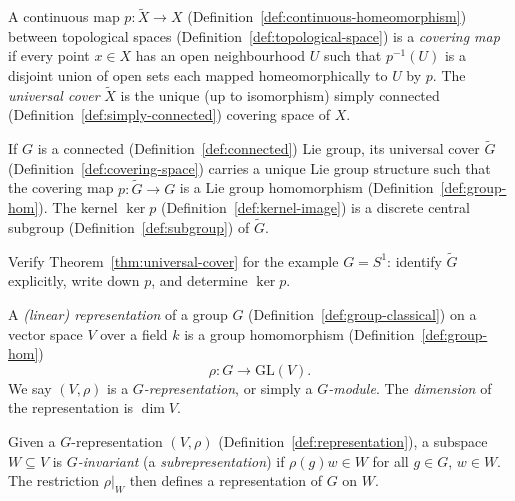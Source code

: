 \begin{definition}
\label{def:covering-space}
A continuous map $p : \widetilde{X} \to X$ (Definition~\ref{def:continuous-homeomorphism}) between topological spaces (Definition~\ref{def:topological-space}) is a \emph{covering map} if every point $x \in X$ has an open neighbourhood $U$ such that $p^{-1}(U)$ is a disjoint union of open sets each mapped homeomorphically to $U$ by $p$.
The \emph{universal cover} $\widetilde{X}$ is the unique (up to isomorphism) simply connected (Definition~\ref{def:simply-connected}) covering space of $X$.
\end{definition}

\begin{theorem}
\label{thm:universal-cover}
If $G$ is a connected (Definition~\ref{def:connected}) Lie group, its universal cover $\widetilde{G}$ (Definition~\ref{def:covering-space}) carries a unique Lie group structure such that the covering map $p : \widetilde{G} \to G$ is a Lie group homomorphism (Definition~\ref{def:group-hom}). The kernel $\ker p$ (Definition~\ref{def:kernel-image}) is a discrete central subgroup (Definition~\ref{def:subgroup}) of $\widetilde{G}$.
\end{theorem}

\begin{exercise}
Verify Theorem~\ref{thm:universal-cover} for the example $G = S^1$: identify $\widetilde{G}$ explicitly, write down $p$, and determine $\ker p$.
\end{exercise}

\begin{definition}[Representation]
\label{def:representation}
A \emph{(linear) representation} of a group $G$ (Definition~\ref{def:group-classical}) on a vector space $V$ over a field $k$ is a group homomorphism (Definition~\ref{def:group-hom})
\[
  \rho : G \to \mathrm{GL}(V).
\]
We say $(V, \rho)$ is a \emph{$G$-representation}, or simply a \emph{$G$-module}. The \emph{dimension} of the representation is $\dim V$.
\end{definition}

\begin{definition}
\label{def:subrepresentation}
Given a $G$-representation $(V, \rho)$ (Definition~\ref{def:representation}), a subspace $W \subseteq V$ is \emph{$G$-invariant} (a \emph{subrepresentation}) if $\rho(g)w \in W$ for all $g \in G$, $w \in W$.
The restriction $\rho|_W$ then defines a representation of $G$ on $W$.
\end{definition}

